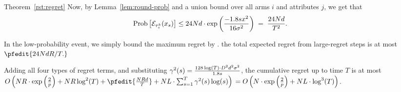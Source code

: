 \begin{emptyextraproof}{Theorem~\ref{rst:regret}}
Now, by Lemma~\ref{lem:round-prob} and a union bound over all arms $i$
and attributes $j$, we get that 
\begin{align*}
\Prob{\AccEU{\tau_s^k}{x_s}}
& \leq 24 \ARMNUM d \cdot \exp \left( \frac{-1.8 s x^2}{16 \sigma^2} \right)
\; = \; \frac{24 \ARMNUM d}{T^2}.
\end{align*}

In the low-probability event, we simply 
bound the maximum regret by \MAXR.
the total expected regret from large-regret steps is at most
$\pfedit{24 \ARMNUM d \MAXR / T.}$

Adding all four types of regret terms,
and substituting 
$\EarlyCut[2]{s} = \frac{128\log(T) \cdot \Diam^2 d^2 \sigma^2}{1.8 s}$,
the cumulative regret up to time $T$ is at most
$
O \left(\ARMNUM \MAXR \cdot \exp \left( \frac{2}{p} \right)
+ \ARMNUM \MAXR \log^2(T)
+ \pfedit{\frac{\ARMNUM \MAXR d}{T}}
+ \ARMNUM \TieDensity \cdot \sum_{s=1}^{T} \EarlyCut[2]{s} \log(s) \right)\\
= 
O \left(\ARMNUM  \cdot \exp \left( \frac{2}{p} \right)
+ \ARMNUM \TieDensity \cdot \log^3(T) \right)$.\QED
\end{emptyextraproof}
